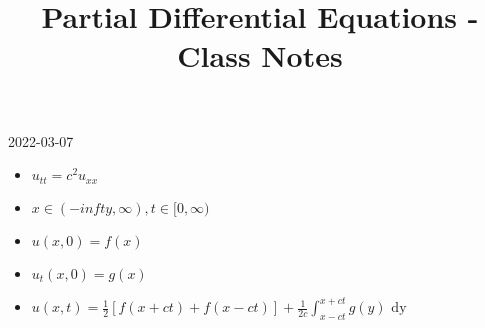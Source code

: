 \documentclass{article}
\title{Partial Differential Equations - Class Notes} %
\begin{document}
\maketitle
\newpage

{2022-03-07}

%
\begin{itemize}
  \item $u_{tt} = c^2 u_{xx}$
  \item $x \in (- infty, \infty), t \in [0, \infty)$
  \item $u(x, 0) = f(x)$
  \item $u_t(x, 0) = g(x)$
  \item $\displaystyle u(x, t) = \frac{1}{2} \left[ f(x + ct) + f(x - ct) \right] + \frac{1}{2c} \int^{x + ct}_{x - ct} g(y) \text{ dy}$
\end{itemize}
%
\end{document}
